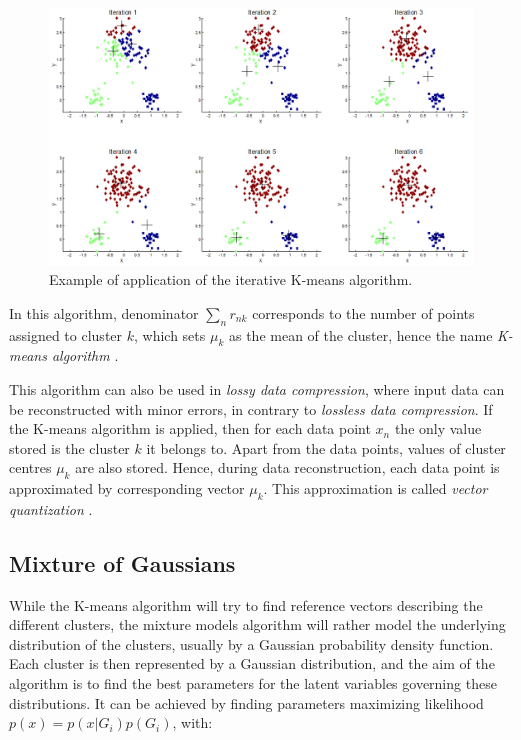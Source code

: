 \vspace{\baselineskip}

\begin{figure}[!h]
\begin{center}
\noindent \includegraphics[scale=0.5]{figures/k-mean_res} 
\newline
\caption{Example of application of the iterative K-means algorithm.}
\label{k-mean_res}
\end{center} 
\end{figure}

\noindent In this algorithm, denominator $\sum\limits_n r_{nk}$ corresponds to the number of points assigned to cluster $k$, which sets $\mu_k$ as the mean of the cluster, hence the name \textit{K-means algorithm} \cite{BIS06}.
\newline

\noindent This algorithm can also be used in \textit{lossy data compression}, where input data can be reconstructed with minor errors, in contrary to \textit{lossless data compression}. If the K-means algorithm is applied, then for each data point $x_n$ the only value stored is the cluster $k$ it belongs to. Apart from the data points, values of cluster centres $\mu_k$ are also stored. Hence, during data reconstruction, each data point is approximated by corresponding vector $\mu_k$. This approximation is called \textit{vector quantization} \cite{BIS06}.
\newline

\subsection{Mixture of Gaussians}

\vspace{\baselineskip}
\noindent While the K-means algorithm will try to find reference vectors describing the different clusters, the mixture models algorithm will rather model the underlying distribution of the clusters, usually by a Gaussian probability density function. Each cluster is then represented by a Gaussian distribution, and the aim of the algorithm is to find the best parameters for the latent variables governing these distributions. It can be achieved by finding parameters maximizing likelihood $p(x)=p(x|G_i)p(G_i)$, with:

